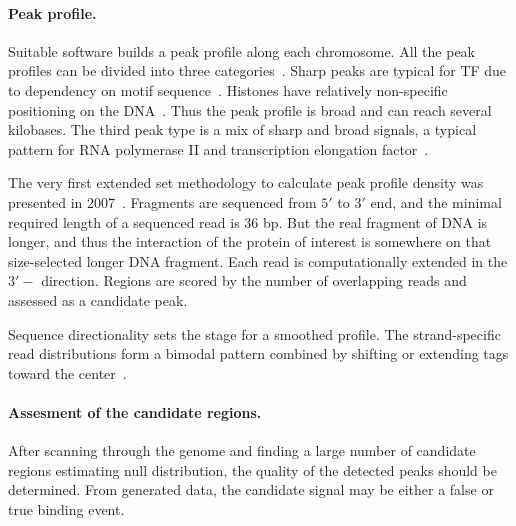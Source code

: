 \paragraph{Peak profile.}
Suitable software builds a peak profile along each chromosome. 
All the peak profiles can be divided into three categories~\cite{park2009chip}. 
Sharp peaks are typical for TF due to dependency on motif sequence~\cite{landt2012chip}. 
Histones have relatively non-specific positioning on the DNA~\cite{krig2007identification}. 
Thus the peak profile is broad and can reach several kilobases. 
The third peak type is a mix of sharp and broad signals, a typical pattern for RNA polymerase II and transcription elongation factor~\cite{squazzo2006suz12, lin2011dynamic}.



The very first extended set methodology to calculate peak profile density was presented in 2007~\cite{robertson2007genome}. 
Fragments are sequenced from $5'$ to $3'$ end, and the minimal required length of a sequenced read is 36 bp. 
But the real fragment of DNA is longer, and thus the interaction of the protein of interest is somewhere on that size-selected longer DNA fragment. 
Each read is computationally extended in the $3'-$ direction. 
Regions are scored by the number of overlapping reads and assessed as a candidate peak.



Sequence directionality sets the stage for a smoothed profile. 
The strand-specific read distributions form a bimodal pattern combined by shifting or extending tags toward the center~\cite{valouev2008genome}.



\paragraph{Assesment of the candidate regions.}
After scanning through the genome and finding a large number of candidate regions estimating null distribution, the quality of the detected peaks should be determined. 
From generated data, the candidate signal may be either a false or true binding event. 

